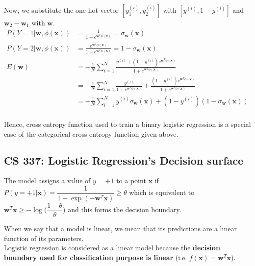 \documentclass[12pt, fleqn]{article}
\begin{document}
Now, we substitute the one-hot vector $[y_1^{(i)}, y_2^{(i)}]$ with $[y^{(i)}, 1 - y^{(i)}]$ and $\mathbf{w}_2 - \mathbf{w}_1$ with $\mathbf{w}$.
\begin{equation*}
  \begin{aligned}
    P(Y = 1| \mathbf{w}, \phi(\mathbf{x})) & = \frac{1}{1 + e^{\mathbf{w}^T \phi(\mathbf{x})}} = \sigma_\mathbf{w} (\mathbf{x})                                                                                                 \\
    P(Y = 2| \mathbf{w}, \phi(\mathbf{x})) & = \frac{e^{\mathbf{w}^T \phi(\mathbf{x})}}{1 + e^{\mathbf{w}^T \phi(\mathbf{x})}} = 1 - \sigma_\mathbf{w} (\mathbf{x})                                                             \\
    E(\mathbf{w})                          & = - \frac{1}{N} \sum_{i=1}^N \frac{y^{(i)} + (1 - y^{(i)}) e^{\mathbf{w}^T \phi(\mathbf{x})}}{1 + e^{\mathbf{w}^T \phi(\mathbf{x})}}                                               \\
                                           & = - \frac{1}{N} \sum_{i=1}^N \frac{y^{(i)}}{1 + e^{\mathbf{w}^T \phi(\mathbf{x})}} + \frac{(1 - y^{(i)}) e^{\mathbf{w}^T \phi(\mathbf{x})}}{1 + e^{\mathbf{w}^T \phi(\mathbf{x})}} \\
                                           & = - \frac{1}{N} \sum_{i=1}^N y^{(i)} \sigma_\mathbf{w} (\mathbf{x}) + (1 - y^{(i)})(1 - \sigma_\mathbf{w} (\mathbf{x}))                                                            \\
  \end{aligned}
\end{equation*}

Hence, cross entropy function used to train a binary logistic regression is a special case of the categorical cross entropy function given above.


\subsection{CS 337: Logistic Regression’s Decision surface}
The model assigns a value of $y = +1$ to a point $\mathbf{x}$ if $P(y = +1 | \mathbf{x}) = \dfrac{1}{1 + \exp (-\mathbf{w}^T \mathbf{x})} \ge \theta$ which is equivalent to $\mathbf{w}^T \mathbf{x} \ge - \log \bigg( \dfrac{1 - \theta}{\theta} \bigg)$ and this forms the decision boundary.

When we say that a model is linear, we mean that its predictions are a linear function of its parameters. \\
Logistic regression is considered as a linear model because the \textbf{decision boundary used for classification purpose is linear} (i.e. $f(\mathbf{x}) = \mathbf{w}^T \mathbf{x}$).
\end{document}
